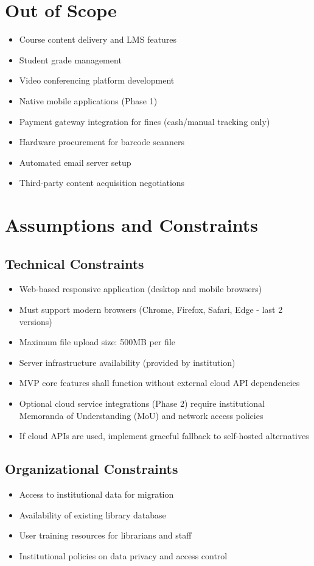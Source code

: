 \documentclass[12pt,a4paper]{report}
\begin{document}
\section{Out of Scope}
\begin{itemize}
    \item Course content delivery and LMS features
    \item Student grade management
    \item Video conferencing platform development
    \item Native mobile applications (Phase 1)
    \item Payment gateway integration for fines (cash/manual tracking only)
    \item Hardware procurement for barcode scanners
    \item Automated email server setup
    \item Third-party content acquisition negotiations
\end{itemize}

\section{Assumptions and Constraints}

\subsection{Technical Constraints}
\begin{itemize}
    \item Web-based responsive application (desktop and mobile browsers)
    \item Must support modern browsers (Chrome, Firefox, Safari, Edge - last 2 versions)
    \item Maximum file upload size: 500MB per file
    \item Server infrastructure availability (provided by institution)
    \item MVP core features shall function without external cloud API dependencies
    \item Optional cloud service integrations (Phase 2) require institutional Memoranda of Understanding (MoU) and network access policies
    \item If cloud APIs are used, implement graceful fallback to self-hosted alternatives
\end{itemize}

\subsection{Organizational Constraints}
\begin{itemize}
    \item Access to institutional data for migration
    \item Availability of existing library database
    \item User training resources for librarians and staff
    \item Institutional policies on data privacy and access control
\end{itemize}
\end{document}
